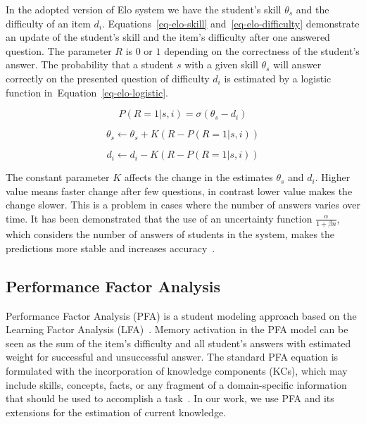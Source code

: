 In the adopted version of Elo system we have the student's skill $\theta_s$ and the difficulty of an item $d_i$. Equations~\ref{eq-elo-skill} and~\ref{eq-elo-difficulty} demonstrate an update of the student's skill and the item's difficulty after one answered question. The parameter $R$ is $0$ or $1$ depending on the correctness of the student's answer. The probability that a student $s$ with a given skill $\theta_s$ will answer correctly on the presented question of difficulty $d_i$ is estimated by a logistic function in~Equation~\ref{eq-elo-logistic}.

\begin{equation} \label{eq-elo-logistic}
  P(R = 1|s,i) = \sigma(\theta_s - d_i)
\end{equation}

\begin{equation} \label{eq-elo-skill}
  \theta_s \gets \theta_s + K(R - P(R = 1|s,i))
\end{equation}

\begin{equation} \label{eq-elo-difficulty}
  d_i \gets d_i - K(R - P(R = 1|s,i))
\end{equation}

The constant parameter $K$ affects the change in the estimates $\theta_s$ and $d_i$. Higher value means faster change after few questions, in contrast lower value makes the change slower. This is a problem in cases where the number of answers varies over time. It has been demonstrated that the use of an uncertainty function $\frac{\alpha}{1 + \beta n}$, which considers the number of answers of students in the system, makes the predictions more stable and increases accuracy~\cite{Vanek2014}.

\subsection{Performance Factor Analysis}
\label{pfa}

Performance Factor Analysis (PFA) is a student modeling approach based on the Learning Factor Analysis (LFA)~\cite{Pavlik2009,cen2007over}. Memory activation in the PFA model can be seen as the sum of the item's difficulty and all student's answers with estimated weight for successful and unsuccessful answer. The standard PFA equation is formulated with the incorporation of knowledge components (KCs), which may include skills, concepts, facts, or any fragment of a domain-specific information that should be used to accomplish a task~\cite{vanlehn2006}. In our work, we use PFA and its extensions for the estimation of current knowledge.

